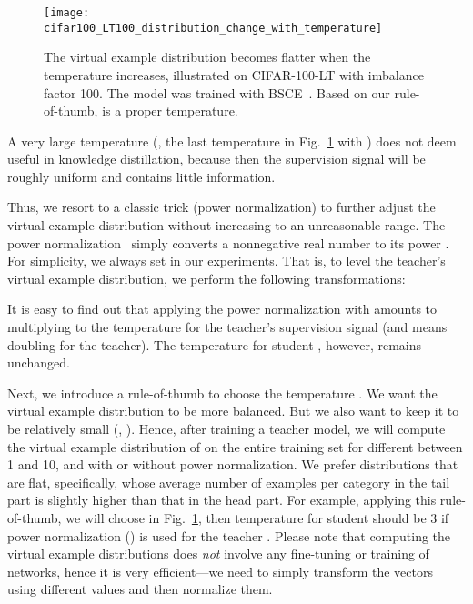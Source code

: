 \documentclass[10pt,twocolumn,letterpaper]{article}
\begin{document}
\begin{figure}
   \centering
   \texttt{[image: cifar100\_LT100\_distribution\_change\_with\_temperature]}
   \caption{The virtual example distribution becomes flatter when the temperature  increases, illustrated on CIFAR-100-LT with imbalance factor 100. The model was trained with BSCE~\cite{ren2020BALMS}. Based on our rule-of-thumb,  is a proper temperature.}
   \label{cifar100_LT_distribution_changes}
\end{figure}

A very large temperature (\eg, the last temperature in Fig.~\ref{cifar100_LT_distribution_changes} with ) does not deem useful in knowledge distillation, because then the supervision signal  will be roughly uniform and contains little information.

Thus, we resort to a classic trick (power normalization) to further adjust the virtual example distribution without increasing  to an unreasonable range. The power normalization~\cite{vi:Perronnin2010} simply converts a nonnegative real number  to its power . For simplicity, we always set  in our experiments. That is, to level the teacher’s virtual example distribution, we perform the following transformations:


It is easy to find out that applying the power normalization with  amounts to multiplying  to the temperature  for the teacher’s supervision signal  (and  means doubling  for the teacher). The temperature for student , however, remains unchanged.

Next, we introduce a rule-of-thumb to choose the temperature . We want the virtual example distribution to be more balanced. But we also want to keep it to be relatively small (\eg, ). Hence, after training a teacher model, we will compute the virtual example distribution of  on the entire training set for different  between 1 and 10, and with or without power normalization. We prefer distributions that are flat, specifically, whose average number of examples per category in the tail part is slightly higher than that in the head part. For example, applying this rule-of-thumb, we will choose  in Fig.~\ref{cifar100_LT_distribution_changes}, then temperature for student  should be 3 if power normalization () is used for the teacher . Please note that computing the virtual example distributions does \emph{not} involve any fine-tuning or training of networks, hence it is very efficient---we need to simply transform the vectors  using different  values and then normalize them.
\end{document}
